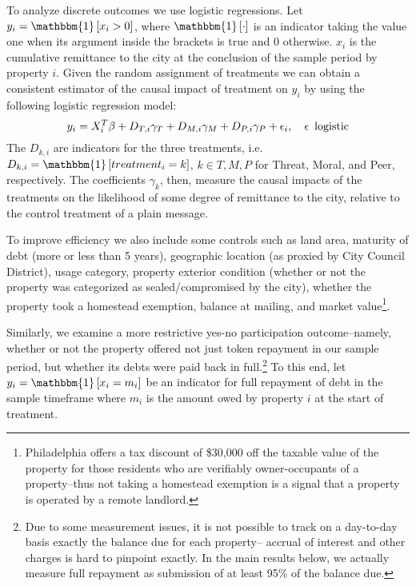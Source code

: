 \documentclass[12pt,titlepage]{article}
\begin{document}
To analyze discrete outcomes we use logistic regressions.
Let $y_{i}=\mathbbm{1}\left[x_i>0\right]$, where
$\mathbbm{1}\left[\cdot\right]$ is an indicator taking the value one
when its argument inside the brackets is true and 0 otherwise. $x_i$ is the
cumulative remittance to the city at the conclusion of the sample
period by property $i$. Given the random assignment of treatments
we can obtain a consistent estimator of the causal impact of treatment on
$y_i$ by using the following logistic regression model:
\begin{equation}
y_{i}=X_i^T\beta +D_{T,i}\gamma_{T}+D_{M,i}\gamma_{M}+D_{P,i}\gamma_{P}
+\epsilon_{i},\hspace{1em}\epsilon \enskip\mbox{logistic}
\end{equation}
The $D_{k,i}$ are indicators for the three treatments, i.e.
$D_{k,i}=\mathbbm{1}\left[treatment_i=k\right]$, $k\in{T,M,P}$ for
Threat, Moral, and Peer, respectively. The coefficients $\gamma_{k}$, then, measure
the causal impacts of the treatments on the likelihood of some degree
of remittance to the city, relative to the control treatment of a
plain message. 

To improve efficiency we also include some controls such as land area, maturity of debt (more
or less than 5 years), geographic location (as proxied by City Council
District), usage category, property exterior condition (whether or not
the property was categorized as sealed/compromised by the city),
whether the property took a homestead exemption, balance at
mailing, and market value\footnote{Philadelphia
  offers a tax discount of \$30,000 off the taxable value of the
  property for those residents who are verifiably owner-occupants of a
  property--thus not taking a homestead exemption is a signal that a
  property is operated by a remote landlord.}.

Similarly, we examine a more restrictive yes-no participation
outcome--namely, whether or not the property offered not just token
repayment in our sample period, but whether its debts were paid back
in full.\footnote{Due to some measurement issues, it is not possible to
  track on a day-to-day basis exactly the balance due for each
  property-- accrual of interest and other charges is hard to pinpoint
  exactly. In the main results below, we actually measure full
  repayment as submission of at least 95\% of the balance due.} To this end, let $y_{i}=\mathbbm{1}\left[x_i=m_i\right]$ be an
indicator for full repayment of debt in the sample timeframe where $m_i$ is
the amount owed by property $i$ at the start of treatment. 
\end{document}
